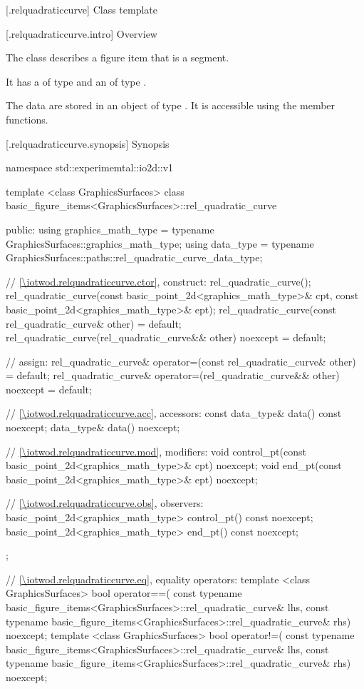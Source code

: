  [\iotwod.relquadraticcurve] {Class template }

 [\iotwod.relquadraticcurve.intro] {Overview}

\pnum
{}%
The class  describes a figure item that is a segment.

\pnum
It has a  of type  and an  of type .

\pnum
The data are stored in an object of type . It is accessible using the  member functions.

 [\iotwod.relquadraticcurve.synopsis] {Synopsis}
\begin{codeblock}
namespace std::experimemtal::io2d::v1 {
  template <class GraphicsSurfaces>
  class basic_figure_items<GraphicsSurfaces>::rel_quadratic_curve {
  public:
    using graphics_math_type = typename GraphicsSurfaces::graphics_math_type;
    using data_type =
      typename GraphicsSurfaces::paths::rel_quadratic_curve_data_type;

    // \ref{\iotwod.relquadraticcurve.ctor}, construct:
    rel_quadratic_curve();
    rel_quadratic_curve(const basic_point_2d<graphics_math_type>& cpt,
      const basic_point_2d<graphics_math_type>& ept);
    rel_quadratic_curve(const rel_quadratic_curve& other) = default;
    rel_quadratic_curve(rel_quadratic_curve&& other) noexcept = default;

    // assign:
    rel_quadratic_curve& operator=(const rel_quadratic_curve& other) = default;
    rel_quadratic_curve& operator=(rel_quadratic_curve&& other) noexcept = default;

    // \ref{\iotwod.relquadraticcurve.acc}, accessors:
    const data_type& data() const noexcept;
    data_type& data() noexcept;

    // \ref{\iotwod.relquadraticcurve.mod}, modifiers:
    void control_pt(const basic_point_2d<graphics_math_type>& cpt) noexcept;
    void end_pt(const basic_point_2d<graphics_math_type>& ept) noexcept;

    // \ref{\iotwod.relquadraticcurve.obs}, observers:
    basic_point_2d<graphics_math_type> control_pt() const noexcept;
    basic_point_2d<graphics_math_type> end_pt() const noexcept;
  };

  // \ref{\iotwod.relquadraticcurve.eq}, equality operators:
  template <class GraphicsSurfaces>
  bool operator==(
    const typename basic_figure_items<GraphicsSurfaces>::rel_quadratic_curve& lhs,
    const typename basic_figure_items<GraphicsSurfaces>::rel_quadratic_curve& rhs) 
    noexcept;  
  template <class GraphicsSurfaces>
  bool operator!=(
    const typename basic_figure_items<GraphicsSurfaces>::rel_quadratic_curve& lhs,
    const typename basic_figure_items<GraphicsSurfaces>::rel_quadratic_curve& rhs) 
    noexcept;  
}
\end{codeblock}

